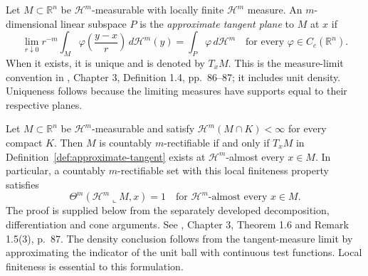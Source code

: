 \begin{definition}\label{def:approximate-tangent}
Let $M\subset\mathbb{R}^n$ be $\mathcal{H}^m$-measurable with locally finite $\mathcal{H}^m$ measure. An $m$-dimensional linear subspace $P$ is the \emph{approximate tangent plane} to $M$ at $x$ if
\[
 \lim_{r\downarrow0}r^{-m}\int_M\varphi\left(\frac{y-x}{r}\right)\,d\mathcal{H}^m(y)
   =\int_P\varphi\,d\mathcal{H}^m
 \quad\text{for every }\varphi\in C_c(\mathbb{R}^n).
\]
When it exists, it is unique and is denoted by $T_xM$. This is the measure-limit convention in \cite{Sim18}, Chapter 3, Definition 1.4, pp.~86--87; it includes unit density. Uniqueness follows because the limiting measures have supports equal to their respective planes.
\end{definition}

\begin{theorem}\label{thm:rectifiable-tangents}
Let $M\subset\mathbb{R}^n$ be $\mathcal{H}^m$-measurable and satisfy $\mathcal{H}^m(M\cap K)<\infty$ for every compact $K$. Then $M$ is countably $m$-rectifiable if and only if $T_xM$ in Definition~\ref{def:approximate-tangent} exists at $\mathcal{H}^m$-almost every $x\in M$. In particular, a countably $m$-rectifiable set with this local finiteness property satisfies
\[
 \Theta^m(\mathcal{H}^m\llcorner M,x)=1
 \quad\text{for }\mathcal{H}^m\text{-almost every }x\in M.
\]
The proof is supplied below from the separately developed decomposition, differentiation and cone arguments. See \cite{Sim18}, Chapter 3, Theorem 1.6 and Remark 1.5(3), p.~87. The density conclusion follows from the tangent-measure limit by approximating the indicator of the unit ball with continuous test functions. Local finiteness is essential to this formulation.
\end{theorem}
